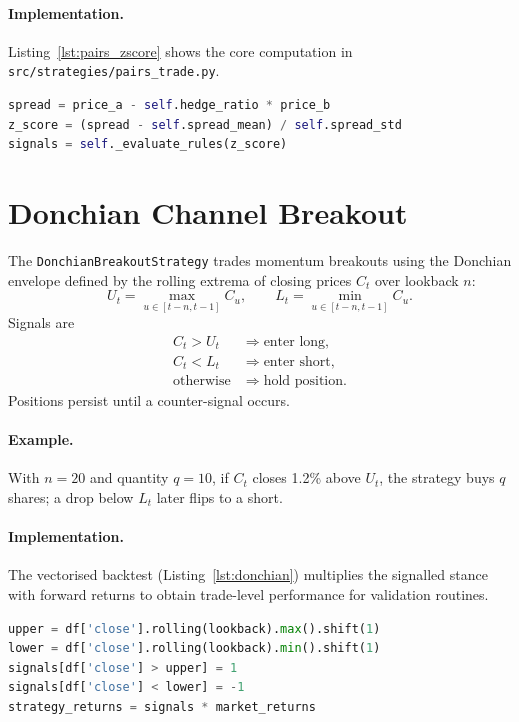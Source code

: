 \paragraph{Implementation.} Listing~\ref{lst:pairs_zscore} shows the core computation in \texttt{src/strategies/pairs\_trade.py}.
\begin{lstlisting}[language=Python,firstnumber=340,label={lst:pairs_zscore},caption={Z-score evaluation in PairsTradeStrategy}]
spread = price_a - self.hedge_ratio * price_b
z_score = (spread - self.spread_mean) / self.spread_std
signals = self._evaluate_rules(z_score)
\end{lstlisting}

\section{Donchian Channel Breakout}
The \texttt{DonchianBreakoutStrategy} trades momentum breakouts using the Donchian envelope defined by the rolling extrema of closing prices $C_t$ over lookback $n$:
\begin{equation}
U_t = \max_{u \in [t-n, t-1]} C_u, \qquad L_t = \min_{u \in [t-n, t-1]} C_u.
\end{equation}
Signals are
\begin{align*}
C_t > U_t &\Rightarrow \text{enter long},\\
C_t < L_t &\Rightarrow \text{enter short},\\
\text{otherwise} &\Rightarrow \text{hold position}.
\end{align*}
Positions persist until a counter-signal occurs.

\paragraph{Example.} With $n=20$ and quantity $q=10$, if $C_t$ closes 1.2\% above $U_t$, the strategy buys $q$ shares; a drop below $L_t$ later flips to a short.

\paragraph{Implementation.} The vectorised backtest (Listing~\ref{lst:donchian}) multiplies the signalled stance with forward returns to obtain trade-level performance for validation routines.
\begin{lstlisting}[language=Python,firstnumber=87,label={lst:donchian},caption={Vectorised Donchian backtest kernel}]
upper = df['close'].rolling(lookback).max().shift(1)
lower = df['close'].rolling(lookback).min().shift(1)
signals[df['close'] > upper] = 1
signals[df['close'] < lower] = -1
strategy_returns = signals * market_returns
\end{lstlisting}

